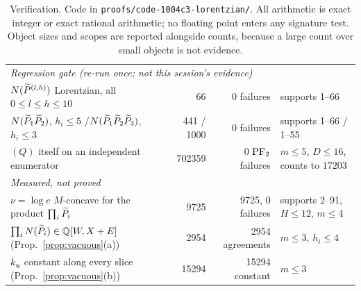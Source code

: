 \begin{table}[t]
\begin{center}
\begin{tabular}{p{}rrp{}}
\hline
\multicolumn{4}{l}{\emph{Regression gate (re-run once; not this session's evidence)}}\\
$N(\widetilde P^{(l,h)})$ Lorentzian, all $0\le l\le h\le10$
  & 66 & 0 failures & supports 1--66\\
$N(\widetilde P_1\widetilde P_2)$, $h_i\le5$ \quad/\quad $N(\widetilde P_1\widetilde P_2\widetilde P_3)$, $h_i\le3$
  & 441 / 1000 & 0 failures & supports 1--66 / 1--55\\
$(Q)$ itself on an independent enumerator
  & 702359 & 0 $\mathrm{PF}_2$ failures & $m\le5$, $D\le16$, counts to $17203$\\
\hline
\multicolumn{4}{l}{\emph{Measured, not proved}}\\
$\nu=\log c$ $M$-concave for the product $\prod_i\widetilde P_i$
  & 9725 & 9725, 0 failures & supports 2--91, $H\le12$, $m\le4$\\
$\prod_iN(\widetilde P_i)\in\mathbb Q[W,X+E]$ (Prop.~\ref{prop:vacuous}(a))
  & 2954 & 2954 agreements & $m\le3$, $h_i\le4$\\
$k_{\mathrm w}$ constant along every slice (Prop.~\ref{prop:vacuous}(b))
  & 15294 & 15294 constant & $m\le3$\\
\hline
\end{tabular}
\end{center}
\caption{Verification. Code in \texttt{proofs/code-1004c3-lorentzian/}. All arithmetic is
exact integer or exact rational arithmetic; no floating point enters any signature test.
Object sizes and scopes are reported alongside counts, because a large count over small
objects is not evidence.}
\label{tab:ver}
\end{table}
